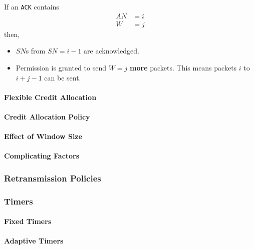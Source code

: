 If an \texttt{ACK} contains
\begin{align*}
  AN &= i \\
  W &= j
\end{align*}
then,
\begin{itemize}[noitemsep]
\item $SN$s from $SN = i - 1$ are acknowledged.
\item Permission is granted to send $W = j$ \textbf{more} packets.
  This means packets $i$ to $i + j - 1$ can be sent.
\end{itemize}

\paragraph{Flexible Credit Allocation}\label{par:TCP_Flexible_Credit_Allocation}
\paragraph{Credit Allocation Policy}\label{par:TCP_Credit_Allocation_Policy}
\paragraph{Effect of Window Size}\label{par:TCP_Window_Size_Effect}
\paragraph{Complicating Factors}\label{par:TCP_Complicating_Factors}
\subsubsection{Retransmission Policies}\label{subsubsec:Retransmission_Policies}
\subsubsection{Timers}\label{subsubsec:Packet_Timers}
\paragraph{Fixed Timers}\label{par:Fixed_Packet_Timers}
\paragraph{Adaptive Timers}\label{par:Adaptive_Packet_Timers}
